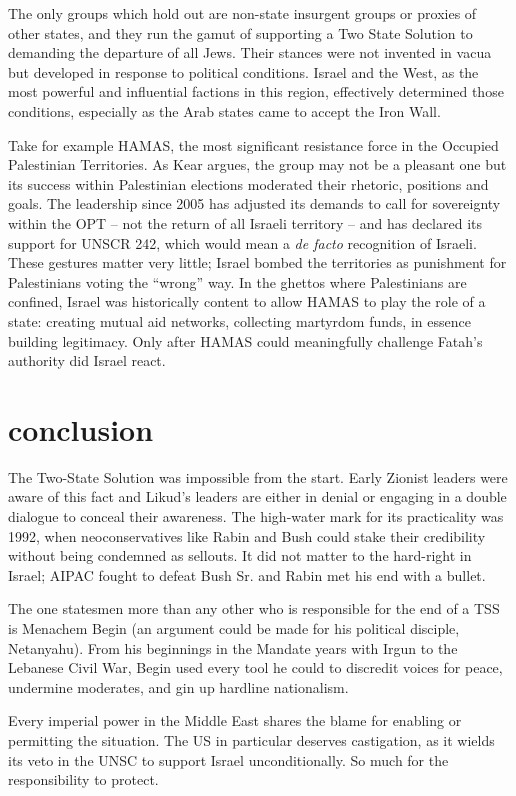 \documentclass[letterpaper,12pt,twoside]{article} %
\begin{document}
\begin{multicols}{2}
The only groups which hold out are non-state insurgent groups or proxies of other states, and they run the gamut of supporting a Two State Solution to demanding the departure of all Jews. Their stances were not invented in vacua but developed in response to political conditions. Israel and the West, as the most powerful and influential factions in this region, effectively determined those conditions, especially as the Arab states came to accept the Iron Wall.

Take for example HAMAS, the most significant resistance force in the Occupied Palestinian Territories. As Kear argues, the group may not be a pleasant one but its success within Palestinian elections moderated their rhetoric, positions and goals.\autocite{kear2022wasatiyyah} The leadership since 2005 has adjusted its demands to call for sovereignty within the OPT -- not the return of all Israeli territory -- and has declared its support for UNSCR 242, which would mean a \textit{de facto} recognition of Israeli. These gestures matter very little; Israel bombed the territories as punishment for Palestinians voting the ``wrong'' way. In the ghettos where Palestinians are confined, Israel was historically content to allow HAMAS to play the role of a state: creating mutual aid networks, collecting martyrdom funds, in essence building legitimacy. Only after HAMAS could meaningfully challenge Fatah's authority did Israel react.

\section*{conclusion}

The Two-State Solution was impossible from the start. Early Zionist leaders were aware of this fact and Likud's leaders are either in denial or engaging in a double dialogue to conceal their awareness. The high-water mark for its practicality was 1992, when neoconservatives like Rabin and Bush could stake their credibility without being condemned as sellouts. It did not matter to the hard-right in Israel; AIPAC fought to defeat Bush Sr. and Rabin met his end with a bullet. 

The one statesmen more than any other who is responsible for the end of a TSS is Menachem Begin (an argument could be made for his political disciple, Netanyahu). From his beginnings in the Mandate years with Irgun to the Lebanese Civil War, Begin used every tool he could to discredit voices for peace, undermine moderates, and gin up hardline nationalism.

Every imperial power in the Middle East shares the blame for enabling or permitting the situation. The US in particular deserves castigation, as it wields its veto in the UNSC to support Israel unconditionally. So much for the responsibility to protect.

\end{multicols}

\nocite{kelman2018onetwo}
\nocite{lustick2019paradigm}
\nocite{kear2022wasatiyyah}
\nocite{omalley2017israel}
\nocite{scheindlin2016confederalism}
\nocite{munayyer2019there}
\nocite{gordon2012western}
\nocite{farsakh2011one}

\vfill
\pagebreak
\printbibliography
\end{document}
